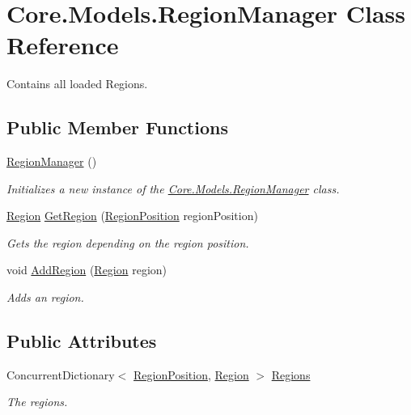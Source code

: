 \hypertarget{classCore_1_1Models_1_1RegionManager}{}\section{Core.\+Models.\+Region\+Manager Class Reference}
\label{classCore_1_1Models_1_1RegionManager}


Contains all loaded Regions.  


\subsection*{Public Member Functions}
\begin{DoxyCompactItemize}
\item 
\hyperlink{classCore_1_1Models_1_1RegionManager_acfec42c6756010d6557616374f7cd37d}{Region\+Manager} ()
\begin{DoxyCompactList}\small\item\em Initializes a new instance of the \hyperlink{classCore_1_1Models_1_1RegionManager}{Core.\+Models.\+Region\+Manager} class. \end{DoxyCompactList}\item 
\hyperlink{classCore_1_1Models_1_1Region}{Region} \hyperlink{classCore_1_1Models_1_1RegionManager_a67a6954541a89c4135f414de61408ef8}{Get\+Region} (\hyperlink{classCore_1_1Models_1_1RegionPosition}{Region\+Position} region\+Position)
\begin{DoxyCompactList}\small\item\em Gets the region depending on the region position. \end{DoxyCompactList}\item 
void \hyperlink{classCore_1_1Models_1_1RegionManager_a2b44e4b56f8c00120f87f0b5bd0b1bcf}{Add\+Region} (\hyperlink{classCore_1_1Models_1_1Region}{Region} region)
\begin{DoxyCompactList}\small\item\em Adds an region. \end{DoxyCompactList}\end{DoxyCompactItemize}
\subsection*{Public Attributes}
\begin{DoxyCompactItemize}
\item 
Concurrent\+Dictionary$<$ \hyperlink{classCore_1_1Models_1_1RegionPosition}{Region\+Position}, \hyperlink{classCore_1_1Models_1_1Region}{Region} $>$ \hyperlink{classCore_1_1Models_1_1RegionManager_a0c119456a8a49f28a14213dad448a5da}{Regions}
\begin{DoxyCompactList}\small\item\em The regions. \end{DoxyCompactList}\end{DoxyCompactItemize}


